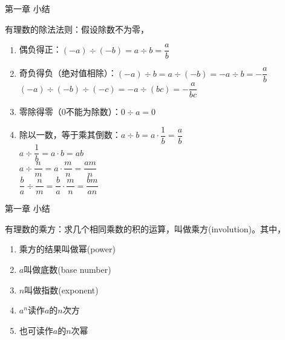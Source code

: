 \documentclass[aspectratio=169]{ctexbeamer} %
\begin{document}
\begin{frame}[t]{第一章 小结}
\begin{spacing}{1.2}
\normalsize
有理数的除法法则：假设除数不为零，
\begin{enumerate}[label={\arabic*.}]
\item 偶负得正：$(-a) ÷  (-b)  = a  ÷  b = \dfrac{a}{b}$ 
\item 奇负得负（绝对值相除）：$(-a)÷b  = a÷(-b) = -a÷b = -\dfrac{a}{b}$ \\
\vspace{0.5cm}
$(-a)÷(-b)÷(-c)  =-a÷(bc) = -\dfrac{a}{bc}$
\item 零除得零（0不能为除数）：$0 ÷  a = 0$
\item 除以一数，等于乘其倒数：$a ÷ b = a  \cdot \dfrac{1}{b} = \dfrac{a}{b}$  \\
\vspace{0.5cm}
$a ÷ \dfrac{1}{b} = a  \cdot b = ab$ \\
\vspace{0.5cm}
$a ÷ \dfrac{n}{m} = a  \cdot \dfrac{m}{n} = \dfrac{am}{n}$ \\
\vspace{0.5cm}
$\dfrac{b}{a} ÷ \dfrac{n}{m} = \dfrac{b}{a}  \cdot \dfrac{m}{n} = \dfrac{bm}{an}$
\end{enumerate}

\end{spacing}
\end{frame}

\begin{frame}[t]{第一章 小结}
\begin{spacing}{1.2}
\normalsize
有理数的乘方：求几个相同乘数的积的运算，叫做乘方(involution)。其中，
\begin{enumerate}[label={\arabic*.}]
\item 乘方的结果叫做幂(power)
\item $a$叫做底数(base number)
\item $n$叫做指数(exponent)
\item $a^n$读作$a$的$n$次方
\item 也可读作$a$的$n$次幂
\end{enumerate}

\end{spacing}
\end{frame}
\end{document}
